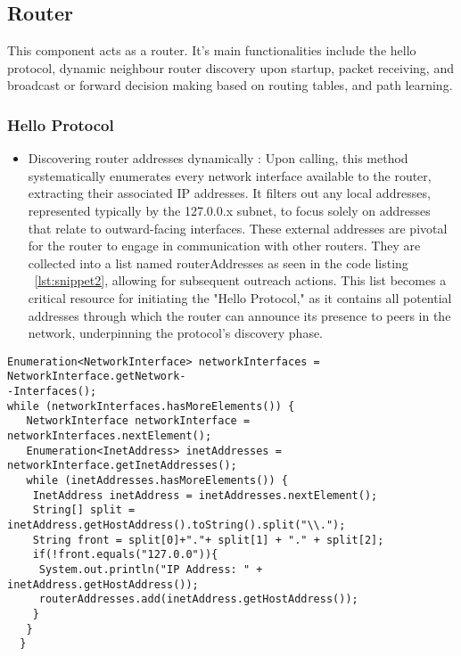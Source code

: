 \documentclass{article}
\begin{document}
\subsection{Router}

This component acts as a router. It’s main functionalities include the hello protocol, dynamic neighbour router discovery upon startup, packet receiving, and broadcast or forward decision making based on routing tables, and path learning.



\subsubsection*{Hello Protocol}
\begin{itemize}
	\item Discovering router addresses dynamically : Upon calling, this method systematically enumerates every network interface available to the router, extracting their associated IP addresses. It filters out any local addresses, represented typically by the 127.0.0.x subnet, to focus solely on addresses that relate to outward-facing interfaces. These external addresses are pivotal for the router to engage in communication with other routers. They are collected into a list named routerAddresses as seen in the code listing ~\ref{lst:snippet2}, allowing for subsequent outreach actions. This list becomes a critical resource for initiating the "Hello Protocol," as it contains all potential addresses through which the router can announce its presence to peers in the network, underpinning the protocol's discovery phase.
\end{itemize}

\begin{lstlisting}[caption={[code snippet 1]This snippet demonstrates how I enumerate every network interface available, exctracting associated IP addresses. Local addresses represented by 127.0.0.x are filtered out. Each external address is added to a list, to be used later for broadcasting or for a Hello Protocol.}, label={lst:snippet2}]
Enumeration<NetworkInterface> networkInterfaces = NetworkInterface.getNetwork-
-Interfaces();
while (networkInterfaces.hasMoreElements()) {
   NetworkInterface networkInterface = networkInterfaces.nextElement();
   Enumeration<InetAddress> inetAddresses = networkInterface.getInetAddresses();
   while (inetAddresses.hasMoreElements()) {
    InetAddress inetAddress = inetAddresses.nextElement();
    String[] split = inetAddress.getHostAddress().toString().split("\\.");
    String front = split[0]+"."+ split[1] + "." + split[2];
    if(!front.equals("127.0.0")){
     System.out.println("IP Address: " + inetAddress.getHostAddress());
     routerAddresses.add(inetAddress.getHostAddress());
    }
   }
  }
\end{lstlisting}
\end{document}
